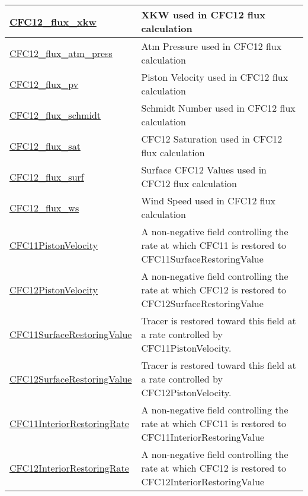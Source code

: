 {\begin{center}
\begin{longtable}{| p{2.0in} | p{4.0in} |}
    \hline
    \hyperref[subsec:var_sec_forcing_CFC12_flux_xkw]{CFC12\_flux\_xkw} & XKW used in CFC12 flux calculation \\
    \hline
    \hyperref[subsec:var_sec_forcing_CFC12_flux_atm_press]{CFC12\_flux\_atm\_press} & Atm Pressure used in CFC12 flux calculation \\
    \hline
    \hyperref[subsec:var_sec_forcing_CFC12_flux_pv]{CFC12\_flux\_pv} & Piston Velocity used in CFC12 flux calculation \\
    \hline
    \hyperref[subsec:var_sec_forcing_CFC12_flux_schmidt]{CFC12\_flux\_schmidt} & Schmidt Number used in CFC12 flux calculation \\
    \hline
    \hyperref[subsec:var_sec_forcing_CFC12_flux_sat]{CFC12\_flux\_sat} & CFC12 Saturation used in CFC12 flux calculation \\
    \hline
    \hyperref[subsec:var_sec_forcing_CFC12_flux_surf]{CFC12\_flux\_surf} & Surface CFC12 Values used in CFC12 flux calculation \\
    \hline
    \hyperref[subsec:var_sec_forcing_CFC12_flux_ws]{CFC12\_flux\_ws} & Wind Speed used in CFC12 flux calculation \\
    \hline
    \hyperref[subsec:var_sec_forcing_CFC11PistonVelocity]{CFC11PistonVelocity} & A non-negative field controlling the rate at which CFC11 is restored to CFC11SurfaceRestoringValue \\
    \hline
    \hyperref[subsec:var_sec_forcing_CFC12PistonVelocity]{CFC12PistonVelocity} & A non-negative field controlling the rate at which CFC12 is restored to CFC12SurfaceRestoringValue \\
    \hline
    \hyperref[subsec:var_sec_forcing_CFC11SurfaceRestoringValue]{CFC11SurfaceRestoringValue} & Tracer is restored toward this field at a rate controlled by CFC11PistonVelocity. \\
    \hline
    \hyperref[subsec:var_sec_forcing_CFC12SurfaceRestoringValue]{CFC12SurfaceRestoringValue} & Tracer is restored toward this field at a rate controlled by CFC12PistonVelocity. \\
    \hline
    \hyperref[subsec:var_sec_forcing_CFC11InteriorRestoringRate]{CFC11InteriorRestoringRate} & A non-negative field controlling the rate at which CFC11 is restored to CFC11InteriorRestoringValue \\
    \hline
    \hyperref[subsec:var_sec_forcing_CFC12InteriorRestoringRate]{CFC12InteriorRestoringRate} & A non-negative field controlling the rate at which CFC12 is restored to CFC12InteriorRestoringValue \\

\end{longtable}
\end{center}}
